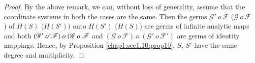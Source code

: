 \begin{proof} %
  By the above remark,  we can,  without loss of generality,  assume
  that the coordinate systems in both the cases are the same. Then the
  germs $\mathscr{G}' ~ o ~ \mathscr{F}$ (\resp  $\mathscr{G} ~ o ~
  \mathscr{F}$) of $H(S)$ (\resp  $H(S'))$ onto $H(S')$ (\resp \break  $H(S)$)
  are germs of infinite analytic maps and both $(\mathscr{G}'  ~ o `
  \mathscr{F}) ~ o ~ (\mathscr{G} ~ o ~ \mathscr{F}$ and $(\mathscr{G}
  ~ o ~ \mathscr{F}) ~o ~ (\mathscr{G}' ~o ~ \mathscr{F}')$ are germs
  of  identity mappings. Hence,  by Proposition
  \ref{chap1:sec1.10:prop10},  $S$,  $S'$ have the 
  same degree and multiplicity. 
\end{proof}
